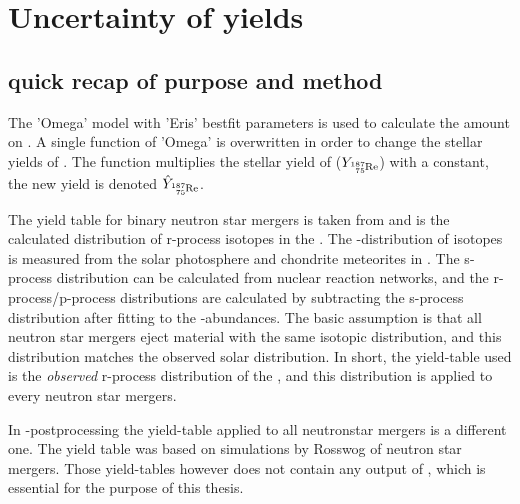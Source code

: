 \section{Uncertainty of yields}

\subsection{quick recap of purpose and method}
The 'Omega' model with 'Eris' bestfit parameters is used to calculate the amount on .
A single function of 'Omega' is overwritten in order to change the stellar yields of .
The function multiplies the stellar yield of  ($Y_\re{187}$) with a constant, the new yield is denoted $\hat{Y}_\re{187}$.

The yield table for binary neutron star mergers is taken from \cite{arnould07} and is the calculated distribution of r-process isotopes in the \sos. The \sos-distribution of isotopes is measured from the solar photosphere and chondrite meteorites in \cite{landolt93}. The s-process distribution can be calculated from nuclear reaction networks, and the r-process/p-process distributions are calculated by subtracting the s-process distribution after fitting to the \sos-abundances.
The basic assumption is that all neutron star mergers eject material with the same isotopic distribution, and this distribution matches the observed solar distribution.
In short, the yield-table used is the \textit{observed} r-process distribution of the \sos, and this distribution is applied to every neutron star mergers.

In \eris-postprocessing\cite{shen15} the yield-table applied to all neutronstar mergers is a different one. The yield table was based on simulations by Rosswog of neutron star mergers. Those yield-tables however does not contain any output of , which is essential for the purpose of this thesis.

